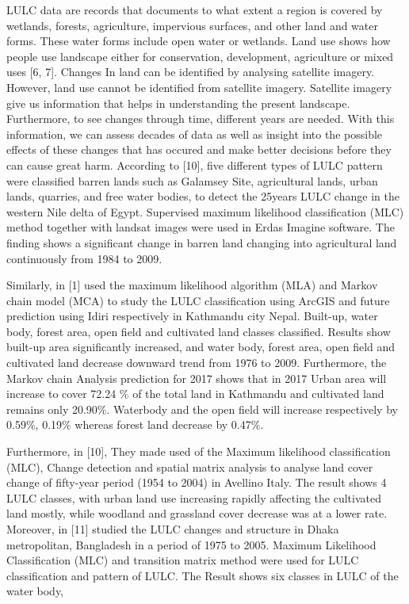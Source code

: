 \documentclass[
  letterpaper,
  DIV=11,
  numbers=noendperiod]{scrartcl}
\begin{document}
LULC data are records that documents to what extent a region is covered
by wetlands, forests, agriculture, impervious surfaces, and other land
and water forms. These water forms include open water or wetlands. Land
use shows how people use landscape either for conservation, development,
agriculture or mixed uses {[}6, 7{]}. Changes In land can be identified
by analysing satellite imagery. However, land use cannot be identified
from satellite imagery. Satellite imagery give us information that helps
in understanding the present landscape. Furthermore, to see changes
through time, different years are needed. With this information, we can
assess decades of data as well as insight into the possible effects of
these changes that has occured and make better decisions before they can
cause great harm. According to {[}10{]}, five different types of LULC
pattern were classified barren lands such as Galamsey Site, agricultural
lands, urban lands, quarries, and free water bodies, to detect the
25years LULC change in the western Nile delta of Egypt. Supervised
maximum likelihood classification (MLC) method together with landsat
images were used in Erdas Imagine software. The finding shows a
significant change in barren land changing into agricultural land
continuously from 1984 to 2009.

Similarly, in {[}1{]} used the maximum likelihood algorithm (MLA) and
Markov chain model (MCA) to study the LULC classification using ArcGIS
and future prediction using Idiri respectively in Kathmandu city Nepal.
Built-up, water body, forest area, open field and cultivated land
classes classified. Results show built-up area significantly increased,
and water body, forest area, open field and cultivated land decrease
downward trend from 1976 to 2009. Furthermore, the Markov chain Analysis
prediction for 2017 shows that in 2017 Urban area will increase to cover
72.24 \(\%\) of the total land in Kathmandu and cultivated land remains
only 20.90\(\%\). Waterbody and the open field will increase
respectively by 0.59\(\%\), 0.19\(\%\) whereas forest land decrease by
0.47\(\%\).

Furthermore, in {[}10{]}, They made used of the Maximum likelihood
classification (MLC), Change detection and spatial matrix analysis to
analyse land cover change of fifty-year period (1954 to 2004) in
Avellino Italy. The result shows 4 LULC classes, with urban land use
increasing rapidly affecting the cultivated land mostly, while woodland
and grassland cover decrease was at a lower rate. Moreover, in {[}11{]}
studied the LULC changes and structure in Dhaka metropolitan, Bangladesh
in a period of 1975 to 2005. Maximum Likelihood Classification (MLC) and
transition matrix method were used for LULC classification and pattern
of LULC. The Result shows six classes in LULC of the water body,
\end{document}
